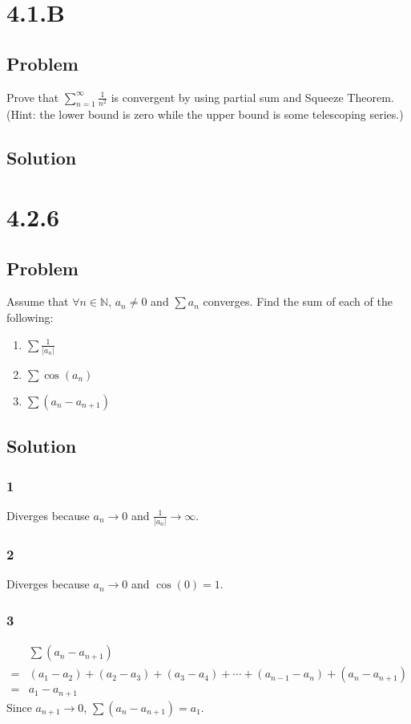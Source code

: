 \documentclass[12pt]{article}
\newcommand{\abs}  [1]{\left|       #1 \right|      }
\newcommand{\N}    [0]{\mathbb{N}                   }
\begin{document}
\section*{4.1.B}

\subsection*{Problem}
Prove that $\sum_{n=1}^\infty \frac{1}{n^2}$ is convergent by using partial sum and Squeeze Theorem. (Hint: the lower bound is zero while the upper bound is some telescoping series.)

\subsection*{Solution}



\section*{4.2.6}

\subsection*{Problem}
Assume that $\forall n \in \N$, $a_n \neq 0$ and $\sum a_n$ converges. Find the sum of each of the following:
\begin{enumerate}
    \item $\sum \frac{1}{\abs{a_n}}$
    \item $\sum \cos(a_n)$
    \item $\sum (a_n - a_{n+1})$
\end{enumerate}

\subsection*{Solution}

\subsubsection*{1}
Diverges because $a_n \to 0$ and $\frac{1}{\abs{a_n}} \to \infty$.

\subsubsection*{2}
Diverges because $a_n \to 0$ and $\cos(0) = 1$.

\subsubsection*{3}
\begin{align*}
     & \sum (a_n - a_{n+1}) \\
    =& (a_1 - a_2) + (a_2 - a_3) + (a_3 - a_4) + \cdots + (a_{n-1} - a_n) + (a_n - a_{n+1}) \\
    =& a_1 - a_{n+1}
\end{align*}
Since $a_{n+1} \to 0$, $\sum (a_n - a_{n+1}) = a_1$.
\end{document}
